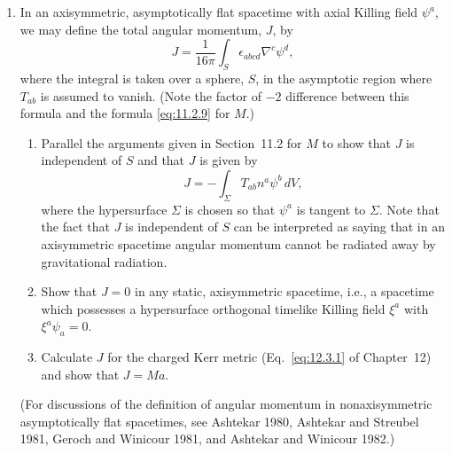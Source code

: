 \begin{enumerate}[label=\arabic*.,leftmargin=2em,itemsep=1.2ex]
\item
In an axisymmetric, asymptotically flat spacetime with axial Killing field \(\psi^a\),
we may define the total angular momentum, \(J\), by
\[
  J=\frac{1}{16\pi}\int_S\epsilon_{abcd}\nabla^c\psi^d,
\]
where the integral is taken over a sphere, \(S\), in the asymptotic region where
\(T_{ab}\) is assumed to vanish. (Note the factor of \(-2\) difference between this
formula and the formula \eqref{eq:11.2.9} for \(M\).)
\begin{enumerate}[label=\alph*),leftmargin=2em,itemsep=.45ex]
\item Parallel the arguments given in Section~11.2 for \(M\) to show that \(J\) is
independent of \(S\) and that \(J\) is given by
\[
  J=-\int_\Sigma T_{ab}n^a\psi^b\,dV,
\]
where the hypersurface \(\Sigma\) is chosen so that \(\psi^a\) is tangent to
\(\Sigma\). Note that the fact that \(J\) is independent of \(S\) can be interpreted as
saying that in an axisymmetric spacetime angular momentum cannot be radiated away
by gravitational radiation.
\item Show that \(J=0\) in any static, axisymmetric spacetime, i.e., a spacetime
which possesses a hypersurface orthogonal timelike Killing field \(\xi^a\) with
\(\xi^a\psi_a=0\).
\item Calculate \(J\) for the charged Kerr metric (Eq.~\eqref{eq:12.3.1} of
Chapter~12) and show that \(J=Ma\).
\end{enumerate}
\noindent
(For discussions of the definition of angular momentum in nonaxisymmetric
asymptotically flat spacetimes, see Ashtekar 1980, Ashtekar and Streubel 1981,
Geroch and Winicour 1981, and Ashtekar and Winicour 1982.)
\end{enumerate}
